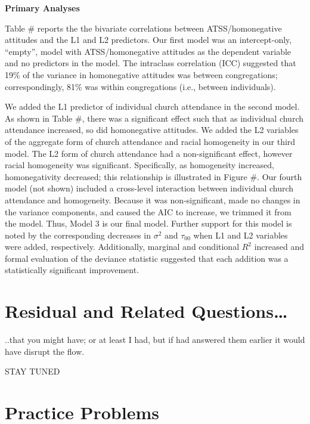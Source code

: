 \documentclass[
  english,
]{book}
\begin{document}
\textbf{Primary Analyses}

Table \# reports the the bivariate correlations between ATSS/homonegative attitudes and the L1 and L2 predictors. Our first model was an intercept-only, ``empty'', model with ATSS/homonegative attitudes as the dependent variable and no predictors in the model. The intraclass correlation (ICC) suggested that 19\% of the variance in homonegative attitudes was between congregations; correspondingly, 81\% was within congregations (i.e., between individuals).

We added the L1 predictor of individual church attendance in the second model. As shown in Table \#, there was a significant effect such that as individual church attendance increased, so did homonegative attitudes. We added the L2 variables of the aggregate form of church attendance and racial homogeneity in our third model. The L2 form of church attendance had a non-significant effect, however racial homogeneity was significant. Specifically, as homogeneity increased, homonegativity decreased; this relationship is illustrated in Figure \#. Our fourth model (not shown) included a cross-level interaction between individual church attendance and homogeneity. Because it was non-significant, made no changes in the variance components, and caused the AIC to increase, we trimmed it from the model. Thus, Model 3 is our final model. Further support for this model is noted by the corresponding decreases in \(\sigma^{2}\) and \(\tau _{00}\) when L1 and L2 variables were added, respectively. Additionally, marginal and conditional \(R^2\) increased and formal evaluation of the deviance statistic suggested that each addition was a statistically significant improvement.

\hypertarget{residual-and-related-questions}{%
\section{Residual and Related Questions\ldots{}}\label{residual-and-related-questions}}

..that you might have; or at least I had, but if had answered them earlier it would have disrupt the flow.

STAY TUNED

\hypertarget{practice-problems}{%
\section{Practice Problems}\label{practice-problems}}
\end{document}
